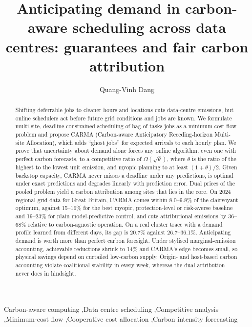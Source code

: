 \documentclass[preprint,12pt]{elsarticle}
\begin{document}
\begin{frontmatter}

\title{Anticipating demand in carbon-aware scheduling across data centres: guarantees and fair carbon attribution}

\author{Quang-Vinh Dang}

\begin{abstract}
Shifting deferrable jobs to cleaner hours and locations cuts data-centre emissions, but online schedulers act before future grid conditions and jobs are known. We formulate multi-site, deadline-constrained scheduling of bag-of-tasks jobs as a minimum-cost flow problem and propose CARMA (Carbon-aware Anticipatory Receding-horizon Multi-site Allocation), which adds ``ghost jobs'' for expected arrivals to each hourly plan. We prove that uncertainty about demand alone forces any online algorithm, even one with perfect carbon forecasts, to a competitive ratio of $\Omega(\sqrt{\theta})$, where $\theta$ is the ratio of the highest to the lowest unit emission, and myopic planning to at least $(1+\theta)/2$. Given backstop capacity, CARMA never misses a deadline under any predictions, is optimal under exact predictions and degrades linearly with prediction error. Dual prices of the pooled problem yield a carbon attribution among sites that lies in the core. On 2024 regional grid data for Great Britain, CARMA comes within 8.0--9.8\% of the clairvoyant optimum, against 15--16\% for the best myopic, protection-level or risk-averse baseline and 19--23\% for plain model-predictive control, and cuts attributional emissions by 36--68\% relative to carbon-agnostic operation. On a real cluster trace with a demand profile learned from different days, its gap is 20.7\% against 26.7--36.1\%. Anticipating demand is worth more than perfect carbon foresight. Under stylised marginal-emission accounting, achievable reductions shrink to 14\% and CARMA's edge becomes small, so physical savings depend on curtailed low-carbon supply. Origin- and host-based carbon accounting violate coalitional stability in every week, whereas the dual attribution never does in hindsight.
\end{abstract}

\begin{keyword}
Carbon-aware computing \sep Data centre scheduling \sep Competitive analysis \sep Minimum-cost flow \sep Cooperative cost allocation \sep Carbon intensity forecasting
\end{keyword}

\end{frontmatter}
\end{document}
